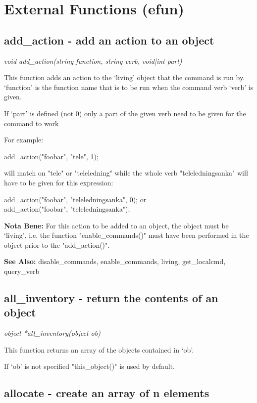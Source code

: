 \section{External Functions (efun)}

\subsection{add\_action - add an action to an object}
    
    {\em void add\_action(string function, string verb, void|int part)}

    This function adds an action to the `living' object that
    the command is run by. `function' is the function name that
    is to be run when the command verb `verb' is given.

    If `part' is defined (not 0) only a part of the given verb
    need to be given for the command to work

    For example:

    add\_action("foobar", "tele", 1);
    
    will match on "tele" or "teleledning" while the whole verb
    "teleledningsanka" will have to be given for this expression:

    add\_action("foobar", "teleledningsanka", 0); or \\
    add\_action("foobar", "teleledningsanka");

    {\bf Nota Bene: }   For this action to be added to an object, the object must be
    `living', i.e. the function "enable\_commands()" must have been
    performed in the object prior to the "add\_action()".
    
    {\bf See Also: }    disable\_commands, enable\_commands, living, get\_localcmd, query\_verb


\subsection{all\_inventory - return the contents of an object}
    
    {\em object *all\_inventory(object ob)}

    This function returns an array of the objects contained in `ob'.

    If `ob' is not specified "this\_object()" is used by default.



\subsection{allocate - create an array of n elements}
    
